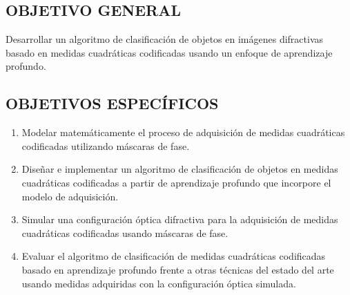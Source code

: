 \subsection{OBJETIVO GENERAL}
Desarrollar un algoritmo de clasificación de objetos en imágenes difractivas basado en medidas cuadráticas codificadas usando un enfoque de aprendizaje profundo.

\subsection{OBJETIVOS ESPECÍFICOS}

\begin{enumerate}

    \item Modelar matemáticamente el proceso de adquisición de medidas cuadráticas codificadas utilizando máscaras de fase.

    \item Diseñar e implementar un algoritmo de clasificación de objetos en medidas cuadráticas codificadas a partir de aprendizaje profundo que incorpore el modelo de adquisición.
    
    \item Simular una configuración óptica difractiva para la adquisición de medidas cuadráticas codificadas usando máscaras de fase.
    
    \item Evaluar el algoritmo de clasificación de medidas cuadráticas codificadas basado en aprendizaje profundo frente a otras técnicas del estado del arte usando medidas adquiridas con la configuración óptica simulada.

\end{enumerate}


\pagebreak